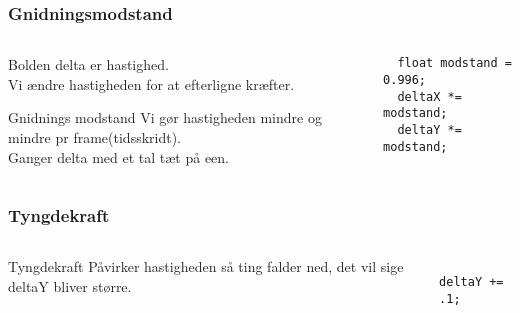 \documentclass{beamer}
\begin{document}
\begin{frame}[fragile]
  \frametitle{Gnidningsmodstand}

  \begin{columns}
    \begin{column}{0.5\textwidth}
  \begin{block}{Bolden}
    delta er hastighed. \\

    Vi ændre hastigheden for at efterligne kræfter.
  \end{block}


  \begin{block}{Gnidnings modstand}
    Vi gør hastigheden mindre og mindre pr frame(tidsskridt).\\
    Ganger delta med et tal tæt på een.
  \end{block}

    \end{column}
    \begin{column}{0.5\textwidth}
\begin{verbatim} 
  float modstand = 0.996;
  deltaX *= modstand;
  deltaY *= modstand;

\end{verbatim}
    \end{column}
  \end{columns}
\end{frame}

\begin{frame}[fragile]
  \frametitle{Tyngdekraft}
  
  \begin{columns}
    \begin{column}{0.5\textwidth}
      
      \begin{block}{Tyngdekraft}
        Påvirker hastigheden så ting falder ned, det vil sige deltaY bliver større.
      \end{block}
      
    \end{column}
    \begin{column}{0.5\textwidth}
\begin{verbatim} 

deltaY += .1;

\end{verbatim}
    \end{column}
  \end{columns}
\end{frame}
\end{document}

